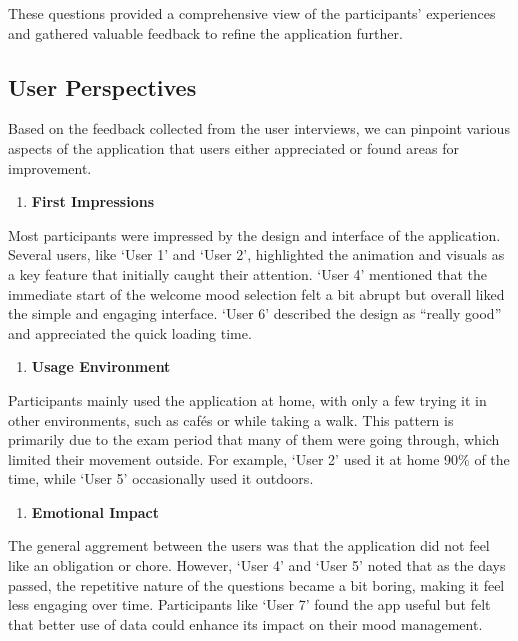 \noindent These questions provided a comprehensive view of the participants’ experiences and gathered valuable feedback to refine the application further.

\subsection{User Perspectives}

Based on the feedback collected from the user interviews, we can pinpoint various aspects of the application that users either appreciated or found areas for improvement.

\begin{enumerate}
    \item \textbf{First Impressions}
\end{enumerate}

\noindent Most participants were impressed by the design and interface of the application. Several users, like `User 1' and `User 2', highlighted the animation and visuals as a key feature that initially caught their attention. `User 4' mentioned that the immediate start of the welcome mood selection felt a bit abrupt but overall liked the simple and engaging interface. `User 6' described the design as ``really good'' and appreciated the quick loading time.

\begin{enumerate}[resume]
    \item \textbf{Usage Environment}
\end{enumerate}

\noindent Participants mainly used the application at home, with only a few trying it in other environments, such as cafés or while taking a walk. This pattern is primarily due to the exam period that many of them were going through, which limited their movement outside. For example, `User 2' used it at home 90\% of the time, while `User 5' occasionally used it outdoors.

\begin{enumerate}[resume]
    \item \textbf{Emotional Impact}
\end{enumerate}

\noindent The general aggrement between the users was that the application did not feel like an obligation or chore. However, `User 4' and `User 5' noted that as the days passed, the repetitive nature of the questions became a bit boring, making it feel less engaging over time. Participants like `User 7' found the app useful but felt that better use of data could enhance its impact on their mood management.

